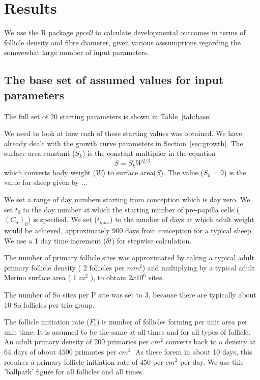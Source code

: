 \documentclass[titlepage]{article}  %
\begin{document}
\section{Results}
We use the R package {\em ppcell} to calculate developmental outcomes in terms of follicle density and fibre diameter, given various asssumptions regarding the somwewhat large number of input parameters.

\subsection{The base set of assumed values for input parameters}
The full set of 20 starting parameters is shown in Table~\ref{tab:base}.

We need to look at how each of these starting values was obtained. We have already dealt with the growth curve parameters in Section~\ref{sec:growth}. The surface area constant ($S_{k}$) is the constant multiplier in the equation
\begin{displaymath}
S = S_{k} W^{2/3}
\end{displaymath}
which converts body weight ($W$) to surface area($S$).  The value ($S_{k} = 9$) is the value for sheep given by ...

 We set a range of day numbers starting from conception which is day zero.  We set $t_{0}$ to the day number at which the starting number of pre-papilla cells ($(C_{n})_{0}$) is specified. We set ($t_{max}$)  to the number of days at which adult weight would be achieved, approximately 900 days from conception for a typical sheep. We use a 1 day time increment ($\delta t$) for stepwise calculation.

 The number of primary follicle sites was approximated by taking a typical adult primary follicle density ( 2 follicles per $mm^{2}$) and multiplying by a typical adult Merino surface area ( 1 $m^{2}$ ), to obtain $2 x 10^{6}$ sites.

 The number of So sites per P site was set to 3, because there are typically about 10 So follicles per trio group. 

 The follicle initiation rate ($F_{r}$) is number of follicles forming per unit area per unit time. It is assumed to be the same at all times and for all types of follicle.  An adult primary density of 200 primaries per $cm^{2}$ converts back to a density at 64 days of about 4500 primaries per $cm^{2}$. As these forem in about 10 days, this requires a primary follicle initiation rate of 450 per $cm^{2}$ per day. We use this 'ballpark' figure for all follicles and all times.
\end{document}
